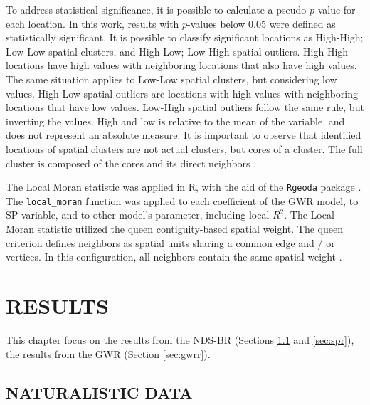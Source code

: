 To address statistical significance, it is possible to calculate a pseudo $p$-value for each location. In this work, results with $p$-values below 0.05 were defined as statistically significant. It is possible to classify significant locations as High-High; Low-Low spatial clusters, and High-Low; Low-High spatial outliers. High-High locations have high values with neighboring locations that also have high values. The same situation applies to Low-Low spatial clusters, but considering low values. High-Low spatial outliers are locations with high values with neighboring locations that have low values. Low-High spatial outliers follow the same rule, but inverting the values. High and low is relative to the mean of the variable, and does not represent an absolute measure. It is important to observe that identified locations of spatial clusters are not actual clusters, but cores of a cluster. The full cluster is composed of the cores and its direct neighbors \cite{anselinLocalIndicatorsSpatial2010}.

The Local Moran statistic was applied in R, with the aid of the \verb|Rgeoda| package \cite{liRgeodaLibrarySpatial2021}. The \verb|local_moran| function was applied to each coefficient of the GWR model, to SP variable, and to other model's parameter, including local $R^2$. The Local Moran statistic utilized the queen contiguity-based spatial weight. The queen criterion defines neighbors as spatial units sharing a common edge and / or vertices. In this configuration, all neighbors contain the same spatial weight \cite{Bivand2013}. 


\chapter{RESULTS} \label{cap:results}


This chapter focus on the results from the NDS-BR (Sections \ref{sec:ndsr} and \ref{sec:spr}), the results from the GWR (Section \ref{sec:gwrr}).

\section{NATURALISTIC DATA} \label{sec:ndsr}


